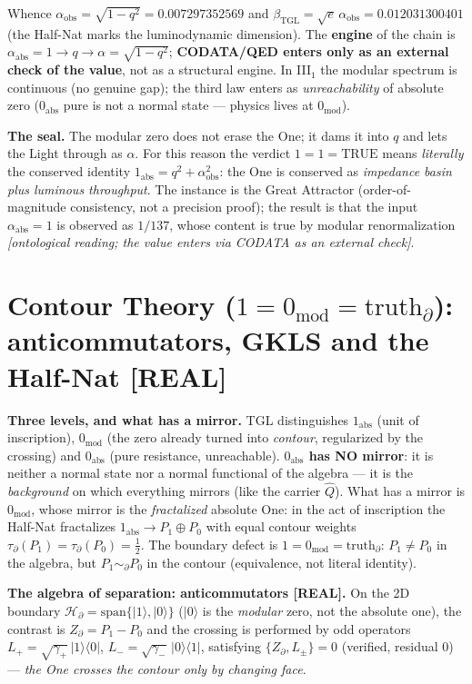 \documentclass[11pt]{article}
\newcommand{\bTGL}{\beta_{\mathrm{TGL}}}\newcommand{\Msun}{M_{\odot}}\newcommand{\TGL}{\mathrm{TGL}}
\theoremstyle{definition}\newtheorem{deriv}{Derivation}
\begin{document}
Whence $\alpha_{\mathrm{obs}}=\sqrt{1-q^2}=0.007297352569$ and $\bTGL=\sqrt e\,\alpha_{\mathrm{obs}}=0.012031300401$ (the Half-Nat marks the luminodynamic dimension). The \textbf{engine} of the chain is $\alpha_{\mathrm{abs}}=1\to q\to\alpha=\sqrt{1-q^2}$; \textbf{CODATA/QED enters only as an external check of the value}, not as a structural engine. In \mbox{III$_1$} the modular spectrum is continuous (no genuine gap); the third law enters as \emph{unreachability} of absolute zero ($0_{\mathrm{abs}}$ pure is not a normal state --- physics lives at $0_{\mathrm{mod}}$).

\textbf{The seal.} The modular zero does not erase the One; it dams it into $q$ and lets the Light through as $\alpha$. For this reason the verdict $\boxed{1=1=\mathrm{TRUE}}$ means \emph{literally} the conserved identity $1_{\mathrm{abs}}=q^2+\alpha_{\mathrm{obs}}^2$: the One is conserved as \emph{impedance basin plus luminous throughput}. The instance is the Great Attractor (order-of-magnitude consistency, not a precision proof); the result is that the input $\alpha_{\mathrm{abs}}=1$ is observed as $1/137$, whose content is true by modular renormalization \emph{[ontological reading; the value enters via CODATA as an external check]}.

\section{Contour Theory ($1=0_{\mathrm{mod}}=\mathrm{truth}_\partial$): anticommutators, GKLS and the Half-Nat \textsf{[REAL]}}

\textbf{Three levels, and what has a mirror.} TGL distinguishes $1_{\mathrm{abs}}$ (unit of inscription), $0_{\mathrm{mod}}$ (the zero already turned into \emph{contour}, regularized by the crossing) and $0_{\mathrm{abs}}$ (pure resistance, unreachable). \textbf{$0_{\mathrm{abs}}$ has NO mirror}: it is neither a normal state nor a normal functional of the algebra --- it is the \emph{background} on which everything mirrors (like the carrier $\hat Q$). What has a mirror is $0_{\mathrm{mod}}$, whose mirror is the \emph{fractalized} absolute One: in the act of inscription the Half-Nat fractalizes $1_{\mathrm{abs}}\to P_1\oplus P_0$ with equal contour weights $\tau_\partial(P_1)=\tau_\partial(P_0)=\tfrac12$. The boundary defect is $\boxed{1=0_{\mathrm{mod}}=\mathrm{truth}_\partial}$: $P_1\neq P_0$ in the algebra, but $P_1\sim_\partial P_0$ in the contour (equivalence, not literal identity).

\textbf{The algebra of separation: anticommutators \textsf{[REAL]}.} On the 2D boundary $\mathcal H_\partial=\mathrm{span}\{|1\rangle,|0\rangle\}$ ($|0\rangle$ is the \emph{modular} zero, not the absolute one), the contrast is $Z_\partial=P_1-P_0$ and the crossing is performed by odd operators $L_+=\sqrt{\gamma_+}\,|1\rangle\langle0|$, $L_-=\sqrt{\gamma_-}\,|0\rangle\langle1|$, satisfying $\boxed{\{Z_\partial,L_\pm\}=0}$ (verified, residual $0$) --- \emph{the One crosses the contour only by changing face}.
\end{document}

